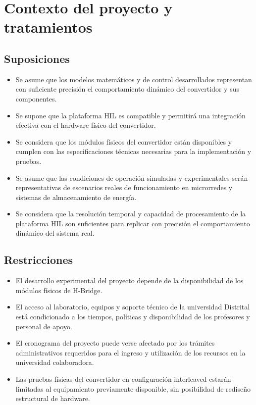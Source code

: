 \section{Contexto del proyecto y tratamientos}

\subsection{Suposiciones}

\begin{itemize}
  \item Se asume que los modelos matemáticos y de control desarrollados representan con suficiente precisión el comportamiento dinámico del convertidor y sus componentes.
  \item Se supone que la plataforma HIL es compatible y permitirá una integración efectiva con el hardware físico del convertidor.
  \item Se considera que los módulos físicos del convertidor están disponibles y cumplen con las especificaciones técnicas necesarias para la implementación y pruebas.
  \item Se asume que las condiciones de operación simuladas y experimentales serán representativas de escenarios reales de funcionamiento en microrredes y sistemas de almacenamiento de energía.
    \item Se considera que la resolución temporal y capacidad de procesamiento de la plataforma HIL son suficientes para replicar con precisión el comportamiento dinámico del sistema real.

\end{itemize}

\subsection{Restricciones}

\begin{itemize}
  \item El desarrollo experimental del proyecto depende de la disponibilidad de los módulos físicos de H-Bridge.
  \item El acceso al laboratorio, equipos y soporte técnico de la universidad Distrital está condicionado a los tiempos, políticas y disponibilidad de los profesores y personal de apoyo.
  \item El cronograma del proyecto puede verse afectado por los trámites administrativos requeridos para el ingreso y utilización de los recursos en la universidad colaboradora.
  \item Las pruebas físicas del convertidor en configuración interleaved estarán limitadas al equipamiento previamente disponible, sin posibilidad de rediseño estructural de hardware.


\end{itemize}

